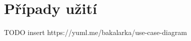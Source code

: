 \section{Případy užití}
\label{sc:use_cases}

















TODO insert
https://yuml.me/bakalarka/use-case-diagram
